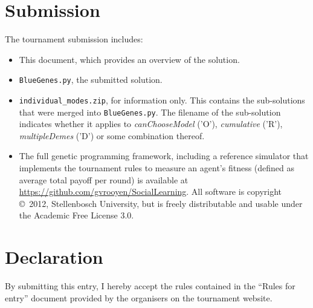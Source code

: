 \documentclass[a4paper,10pt]{article}
\begin{document}
\section{Submission}
The tournament submission includes:
\begin{itemize}
 \item This document, which provides an overview of the solution.
 \item \texttt{BlueGenes.py}, the submitted solution.
 \item \texttt{individual\_modes.zip}, for information only. This contains the sub-solutions that were merged into
   \texttt{BlueGenes.py}. The filename of the sub-solution indicates whether it applies to \emph{canChooseModel}
   ('O'), \emph{cumulative} ('R'), \emph{multipleDemes} ('D') or some combination thereof.
 \item The full genetic programming framework, including a reference simulator that implements the tournament
   rules to measure an agent's fitness (defined as average total payoff per round) is available at
   \href{https://github.com/gvrooyen/SocialLearning}{https://github.com/gvrooyen/SocialLearning}. All software
   is copyright \copyright\ 2012, Stellenbosch University, but is freely distributable and usable under the
   Academic Free License 3.0.
\end{itemize}


\section{Declaration}
By submitting this entry, I hereby accept the rules contained in the ``Rules for entry'' document provided by
the organisers on the tournament website.
\end{document}
